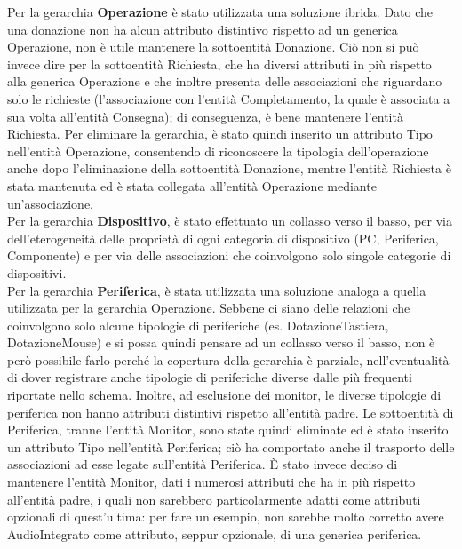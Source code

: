 \documentclass[a4paper,12pt]{report}
\begin{document}
Per la gerarchia \textbf{Operazione} è stato utilizzata una soluzione ibrida. Dato che una donazione non ha alcun attributo distintivo rispetto ad un generica Operazione, non è utile mantenere la sottoentità Donazione. Ciò non si può invece dire per la sottoentità Richiesta, che ha diversi attributi in più rispetto alla generica Operazione e che inoltre presenta delle associazioni che riguardano solo le richieste (l'associazione con l'entità Completamento, la quale è associata a sua volta all'entità Consegna); di conseguenza, è bene mantenere l'entità Richiesta. Per eliminare la gerarchia, è stato quindi inserito un attributo Tipo nell'entità Operazione, consentendo di riconoscere la tipologia dell'operazione anche dopo l'eliminazione della sottoentità Donazione, mentre l'entità Richiesta è stata mantenuta ed è stata collegata all'entità Operazione mediante un'associazione. \\

Per la gerarchia \textbf{Dispositivo}, è stato effettuato un collasso verso il basso, per via dell'eterogeneità delle proprietà di ogni categoria di dispositivo (PC, Periferica, Componente) e per via delle associazioni che coinvolgono solo singole categorie di dispositivi. \\

Per la gerarchia \textbf{Periferica}, è stata utilizzata una soluzione analoga a quella utilizzata per la gerarchia Operazione. Sebbene ci siano delle relazioni che coinvolgono solo alcune tipologie di periferiche (es. DotazioneTastiera, DotazioneMouse) e si possa quindi pensare ad un collasso verso il basso, non è però possibile farlo perché la copertura della gerarchia è parziale, nell'eventualità di dover registrare anche tipologie di periferiche diverse dalle più frequenti riportate nello schema. Inoltre, ad esclusione dei monitor, le diverse tipologie di periferica non hanno attributi distintivi rispetto all'entità padre. Le sottoentità di Periferica, tranne l'entità Monitor, sono state quindi eliminate ed è stato inserito un attributo Tipo nell'entità Periferica; ciò ha comportato anche il trasporto delle associazioni ad esse legate sull'entità Periferica. È stato invece deciso di mantenere l'entità Monitor, dati i numerosi attributi che ha in più rispetto all'entità padre, i quali non sarebbero particolarmente adatti come attributi opzionali di quest'ultima: per fare un esempio, non sarebbe molto corretto avere AudioIntegrato come attributo, seppur opzionale, di una generica periferica. \\
\end{document}
